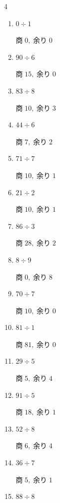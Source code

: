 \begin{multicols}{4}
\begin{enumerate}
        $商\; 24,\; 余り\; 0$

  \item $0 \div 1$

        $商\; 0,\; 余り\; 0$

  \item $90 \div 6$

        $商\; 15,\; 余り\; 0$

  \item $83 \div 8$

        $商\; 10,\; 余り\; 3$

  \item $44 \div 6$

        $商\; 7,\; 余り\; 2$

  \item $71 \div 7$

        $商\; 10,\; 余り\; 1$

  \item $21 \div 2$

        $商\; 10,\; 余り\; 1$

  \item $86 \div 3$

        $商\; 28,\; 余り\; 2$

  \item $8 \div 9$

        $商\; 0,\; 余り\; 8$

  \item $70 \div 7$

        $商\; 10,\; 余り\; 0$

\columnbreak %

  \item $81 \div 1$

        $商\; 81,\; 余り\; 0$

  \item $29 \div 5$

        $商\; 5,\; 余り\; 4$

  \item $91 \div 5$

        $商\; 18,\; 余り\; 1$

  \item $52 \div 8$

        $商\; 6,\; 余り\; 4$

  \item $36 \div 7$

        $商\; 5,\; 余り\; 1$

  \item $88 \div 8$


\end{enumerate}
\end{multicols}

